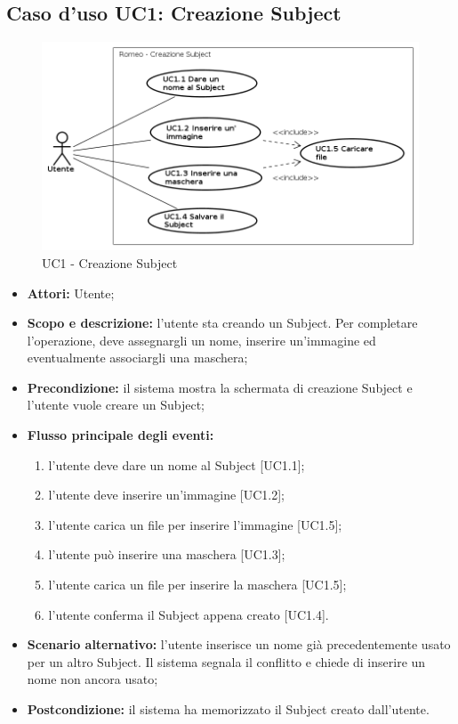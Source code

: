 \subsection{Caso d'uso UC1: Creazione Subject}
\begin{figure}[!h]
\begin{center}
\includegraphics[scale=0.6]{./img/Use_Case/UC1}
\caption{UC1 - Creazione Subject}
\end{center}
\end{figure}
\begin{itemize}
\item \textbf{Attori:} Utente;
\item \textbf{Scopo e descrizione:} l'utente sta creando un Subject\glossario{}. Per completare l'operazione, deve assegnargli un nome, inserire un'immagine ed eventualmente associargli una maschera\glossario{};
\item \textbf{Precondizione:} il sistema mostra la schermata di creazione Subject\glossario{} e l'utente vuole creare un Subject\glossario{};
\item \textbf{Flusso principale degli eventi:} 
\begin{enumerate}
\item l'utente deve dare un nome al Subject\glossario{} [UC1.1];
\item l'utente deve inserire un'immagine [UC1.2];
\item l'utente carica un file per inserire l'immagine [UC1.5];
\item l'utente può inserire una maschera\glossario{} [UC1.3];
\item l'utente carica un file per inserire la maschera\glossario{} [UC1.5];
\item l'utente conferma il Subject\glossario{} appena creato [UC1.4].
\end{enumerate}
\item \textbf{Scenario alternativo:} l'utente inserisce un nome già precedentemente usato per un altro Subject\glossario{}. Il sistema segnala il conflitto e chiede di inserire un nome non ancora usato;
\item \textbf{Postcondizione:} il sistema ha memorizzato il Subject\glossario{} creato dall'utente.
\end{itemize}

